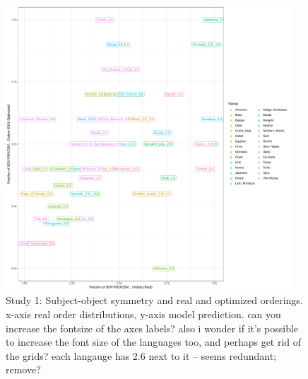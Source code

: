 \documentclass[11pt,a4paper]{article}
\newcommand\comment[1]{{\color{red}#1}}
\begin{document}
\begin{figure}
    \centering
    \includegraphics[width=0.95\textwidth]{figures/fracion-optimized_DLM_2.6.pdf}
    \caption{Study 1: Subject-object symmetry and real and optimized orderings. x-axis real order distributions, y-axis model prediction. \comment{can you increase the fontsize of the axes labels? also i wonder if it's possible to increase the font size of the languages too, and perhaps get rid of the grids? each langauge has 2.6 next to it -- seems redundant; remove?}}
    \label{fig:study1}
\end{figure}



\end{document}
